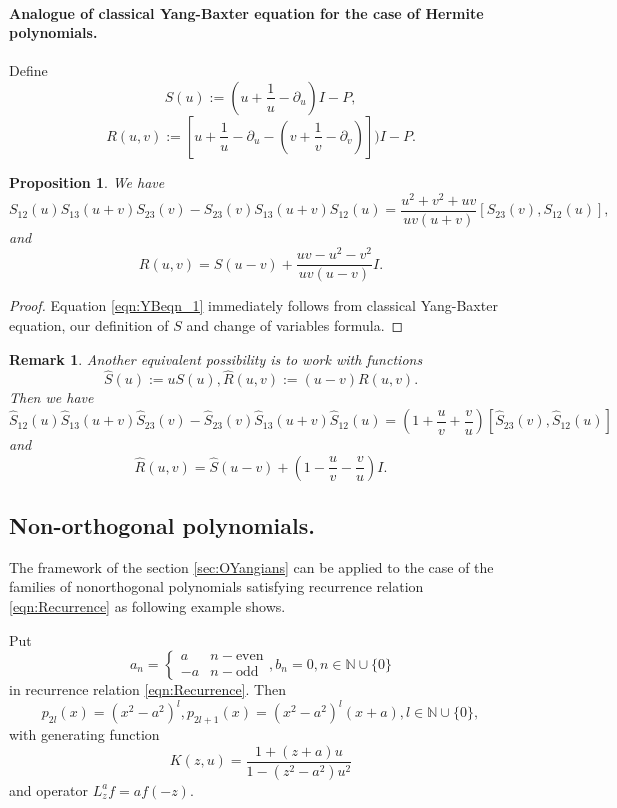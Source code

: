 \documentclass[10pt]{article}%
\numberwithin{equation}{section}
\newtheorem{prop}[thm]{Proposition}
\newtheorem{rem}[thm]{Remark}
\newcommand{\red}{\color{red}}
\begin{document}
\paragraph{Analogue of classical Yang-Baxter equation for the case of Hermite polynomials.}

Define 
\[
S(u):=(u+\frac{1}{u}-\partial_u)I-P, 
\]
\[
R(u,v):=\left[u+\frac{1}{u}-\partial_u-\left(v+\frac{1}{v}-\partial_v\right)\right])I-P.
\]
\begin{prop}
We have
\begin{equation}\label{eqn:YBeqn_1}
S_{12}(u)S_{13}(u+v)S_{23}(v)-S_{23}(v)S_{13}(u+v)S_{12}(u)=\frac{u^2+v^2+uv}{uv(u+v)}[S_{23}(v),S_{12}(u)],
\end{equation}
and
\begin{equation}\label{eqn:YBeqn_2}
R(u,v)=S(u-v)+\frac{uv-u^2-v^2}{uv(u-v)} I.
\end{equation}
\end{prop}
\begin{proof}
Equation \ref{eqn:YBeqn_1} immediately follows from classical Yang-Baxter equation, our definition of $S$ and change of variables formula.
\end{proof}

\begin{rem}
Another equivalent possibility is to work with functions
\[
\widehat{S}(u):=uS(u), \widehat{R}(u,v):=(u-v)R(u,v).
\]
 Then we have
\[
\widehat{S}_{12}(u)\widehat{S}_{13}(u+v)\widehat{S}_{23}(v)-\widehat{S}_{23}(v)\widehat{S}_{13}(u+v)\widehat{S}_{12}(u)=\left(1+\frac{u}{v}+\frac{v}{u}\right)[\widehat{S}_{23}(v),\widehat{S}_{12}(u)]
\]
 and
 \[
\widehat{R}(u,v)=\widehat{S}(u-v)+\left(1-\frac{u}{v}-\frac{v}{u}\right) I.
\]
\end{rem}
\subsection{Non-orthogonal polynomials.}
The framework of the section \ref{sec:OYangians} can be applied to the case of the families of nonorthogonal polynomials satisfying recurrence relation \eqref{eqn:Recurrence} as following example shows. 

Put 
\[
a_n=\left\{
\begin{array}{cc}
    a &  n-\mbox{even}\\
    -a & n-\mbox{odd}
\end{array}
\right., b_n=0,n\in\mathbb{N}\cup\{0\}
\]
in recurrence relation \eqref{eqn:Recurrence}. 
Then
\[
p_{2l}(x)=(x^2-a^2)^l, p_{2l+1}(x)=(x^2-a^2)^l (x+a), l\in \mathbb{N}\cup\{0\},
\]
with generating function
\[
K(z,u)=\frac{1+(z+a)u}{1-(z^2-a^2)u^2}
\]
and operator $L_z^{a}f=a f(-z)$. 
\end{document}
